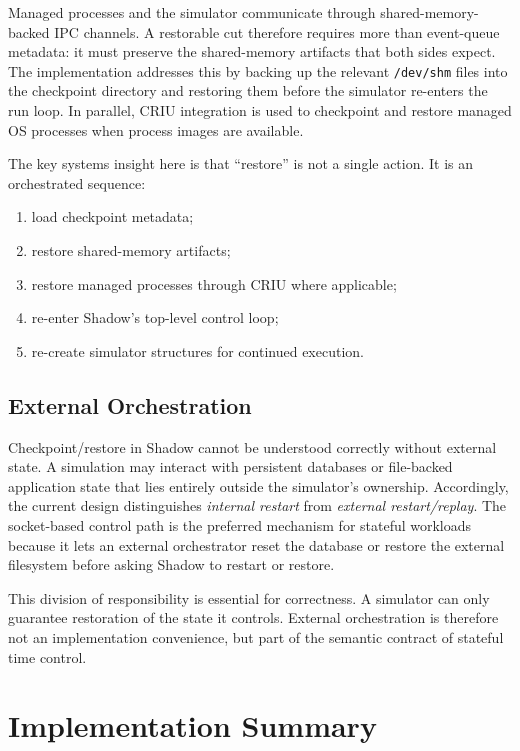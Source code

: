\documentclass[11pt,a4paper]{article}
\begin{document}
Managed processes and the simulator communicate through shared-memory-backed
IPC channels. A restorable cut therefore requires more than event-queue
metadata: it must preserve the shared-memory artifacts that both sides expect.
The implementation addresses this by backing up the relevant \texttt{/dev/shm}
files into the checkpoint directory and restoring them before the simulator
re-enters the run loop. In parallel, CRIU integration is used to checkpoint
and restore managed OS processes when process images are available.

The key systems insight here is that ``restore'' is not a single action. It is
an orchestrated sequence:

\begin{enumerate}[leftmargin=1.7em]
  \item load checkpoint metadata;
  \item restore shared-memory artifacts;
  \item restore managed processes through CRIU where applicable;
  \item re-enter Shadow's top-level control loop;
  \item re-create simulator structures for continued execution.
\end{enumerate}

\subsection{External Orchestration}

Checkpoint/restore in Shadow cannot be understood correctly without external
state. A simulation may interact with persistent databases or file-backed
application state that lies entirely outside the simulator's ownership.
Accordingly, the current design distinguishes \emph{internal restart} from
\emph{external restart/replay}. The socket-based control path is the preferred
mechanism for stateful workloads because it lets an external orchestrator reset
the database or restore the external filesystem before asking Shadow to
restart or restore.

This division of responsibility is essential for correctness. A simulator can
only guarantee restoration of the state it controls. External orchestration is
therefore not an implementation convenience, but part of the semantic
contract of stateful time control.

\section{Implementation Summary}
\end{document}
